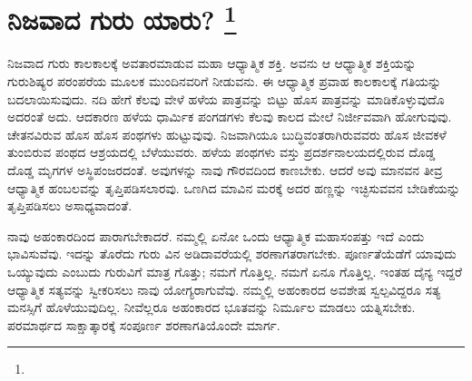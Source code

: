 
\chapter[ನಿಜವಾದ ಗುರು ಯಾರು? ]{ನಿಜವಾದ ಗುರು ಯಾರು? \protect\footnote{}}

ನಿಜವಾದ ಗುರು ಕಾಲಕಾಲಕ್ಕೆ ಅವತಾರಮಾಡುವ ಮಹಾ ಆಧ್ಯಾತ್ಮಿಕ ಶಕ್ತಿ. ಅವನು ಆ ಆಧ್ಯಾತ್ಮಿಕ ಶಕ್ತಿಯನ್ನು ಗುರುಶಿಷ್ಯರ ಪರಂಪರೆಯ ಮೂಲಕ ಮುಂದಿನವರಿಗೆ ನೀಡುವನು. ಈ ಆಧ್ಯಾತ್ಮಿಕ ಪ್ರವಾಹ ಕಾಲಕಾಲಕ್ಕೆ ಗತಿಯನ್ನು ಬದಲಾಯಿಸುವುದು. ನದಿ ಹೇಗೆ ಕೆಲವು ವೇಳೆ ಹಳೆಯ ಪಾತ್ರವನ್ನು ಬಿಟ್ಟು ಹೊಸ ಪಾತ್ರವನ್ನು ಮಾಡಿಕೊಳ್ಳುವುದೊ ಅದರಂತೆ ಅದು. ಆದಕಾರಣ ಹಳೆಯ ಧಾರ್ಮಿಕ ಪಂಗಡಗಳು ಕೆಲವು ಕಾಲದ ಮೇಲೆ ನಿರ್ಜೀವವಾಗಿ ಹೋಗುವುವು. ಚೇತನವಿರುವ ಹೊಸ ಹೊಸ ಪಂಥಗಳು ಹುಟ್ಟುವುವು. ನಿಜವಾಗಿಯೂ ಬುದ್ಧಿವಂತರಾಗಿರುವವರು ಹೊಸ ಜೀವಕಳೆ ತುಂಬಿರುವ ಪಂಥದ ಆಶ್ರಯದಲ್ಲಿ ಬೆಳೆಯುವರು. ಹಳೆಯ ಪಂಥಗಳು ವಸ್ತು ಪ್ರದರ್ಶನಾಲಯದಲ್ಲಿರುವ ದೊಡ್ಡ ದೊಡ್ಡ ಮೃಗಗಳ ಅಸ್ಥಿಪಂಜರದಂತೆ. ಅವುಗಳನ್ನು ನಾವು ಗೌರವದಿಂದ ಕಾಣಬೇಕು. ಆದರೆ ಅವು ಮಾನವನ ತೀವ್ರ ಆಧ್ಯಾತ್ಮಿಕ ಹಂಬಲವನ್ನು ತೃಪ್ತಿಪಡಿಸಲಾರವು. ಒಣಗಿದ ಮಾವಿನ ಮರಕ್ಕೆ ಅದರ ಹಣ್ಣನ್ನು ಇಚ್ಛಿಸುವವನ ಬೇಡಿಕೆಯನ್ನು ತೃಪ್ತಿಪಡಿಸಲು ಅಸಾಧ್ಯವಾದಂತೆ.

ನಾವು ಅಹಂಕಾರದಿಂದ ಪಾರಾಗಬೇಕಾದರೆ. ನಮ್ಮಲ್ಲಿ ಏನೋ ಒಂದು ಆಧ್ಯಾತ್ಮಿಕ ಮಹಾಸಂಪತ್ತು ಇದೆ ಎಂದು ಭಾವಿಸುವೆವು. ಇದನ್ನು ತೊರೆದು ಗುರು ವಿನ ಅಡಿದಾವರೆಯಲ್ಲಿ ಶರಣಾಗತರಾಗಬೇಕು. ಪೂರ್ಣತೆಯೆಡೆಗೆ ಯಾವುದು ಒಯ್ಯುವುದು ಎಂಬುದು ಗುರುವಿಗೆ ಮಾತ್ರ ಗೊತ್ತು; ನಮಗೆ ಗೊತ್ತಿಲ್ಲ. ನಮಗೆ ಏನೂ ಗೊತ್ತಿಲ್ಲ. ಇಂತಹ ದೈನ್ಯ ಇದ್ದರೆ ಆಧ್ಯಾತ್ಮಿಕ ಸತ್ಯವನ್ನು ಸ್ವೀಕರಿಸಲು ನಾವು ಯೋಗ್ಯರಾಗುವೆವು. ನಮ್ಮಲ್ಲಿ ಅಹಂಕಾರದ ಅವಶೇಷ ಸ್ವಲ್ಪವಿದ್ದರೂ ಸತ್ಯ ಮನಸ್ಸಿಗೆ ಹೊಳೆಯುವುದಿಲ್ಲ. ನೀವೆಲ್ಲರೂ ಅಹಂಕಾರದ ಭೂತವನ್ನು ನಿರ್ಮೂಲ ಮಾಡಲು ಯತ್ನಿಸಬೇಕು. ಪರಮಾರ್ಥದ ಸಾಕ್ಷಾತ್ಕಾರಕ್ಕೆ ಸಂಪೂರ್ಣ ಶರಣಾಗತಿಯೊಂದೇ ಮಾರ್ಗ.

